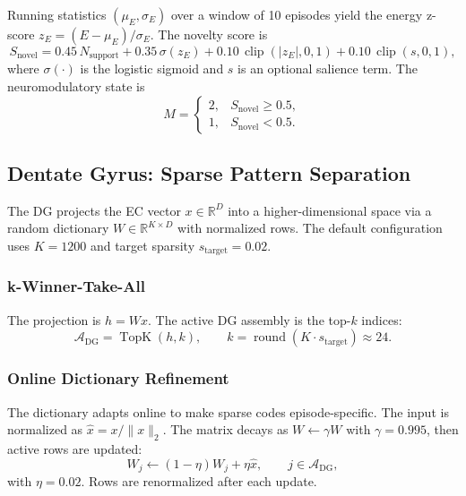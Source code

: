 Running statistics $(\mu_E, \sigma_E)$ over a window of 10 episodes yield the energy z-score $z_E = (E - \mu_E) / \sigma_E$. The novelty score is
\begin{equation}
S_{\mathrm{novel}} = 0.45\,N_{\mathrm{support}} + 0.35\,\sigma(z_E) + 0.10\,\operatorname{clip}(|z_E|, 0, 1) + 0.10\,\operatorname{clip}(s, 0, 1),
\label{eq:novelty}
\end{equation}
where $\sigma(\cdot)$ is the logistic sigmoid and $s$ is an optional salience term. The neuromodulatory state is
\begin{equation}
M =
\begin{cases}
2, & S_{\mathrm{novel}} \geq 0.5, \\
1, & S_{\mathrm{novel}} < 0.5.
\end{cases}
\end{equation}


\subsection{Dentate Gyrus: Sparse Pattern Separation}
\label{sec:dg}

The DG projects the EC vector $x \in \mathbb{R}^D$ into a higher-dimensional space via a random dictionary $W \in \mathbb{R}^{K \times D}$ with normalized rows. The default configuration uses $K=1200$ and target sparsity $s_{\mathrm{target}} = 0.02$.

\subsubsection{k-Winner-Take-All}

The projection is $h = Wx$. The active DG assembly is the top-$k$ indices:
\begin{equation}
\mathcal{A}_{\mathrm{DG}} = \operatorname{TopK}(h, k), \qquad k = \operatorname{round}(K \cdot s_{\mathrm{target}}) \approx 24.
\end{equation}

\subsubsection{Online Dictionary Refinement}

The dictionary adapts online to make sparse codes episode-specific. The input is normalized as $\hat{x} = x / \|x\|_2$. The matrix decays as $W \leftarrow \gamma W$ with $\gamma = 0.995$, then active rows are updated:
\begin{equation}
W_j \leftarrow (1 - \eta)W_j + \eta\hat{x}, \qquad j \in \mathcal{A}_{\mathrm{DG}},
\end{equation}
with $\eta = 0.02$. Rows are renormalized after each update.

